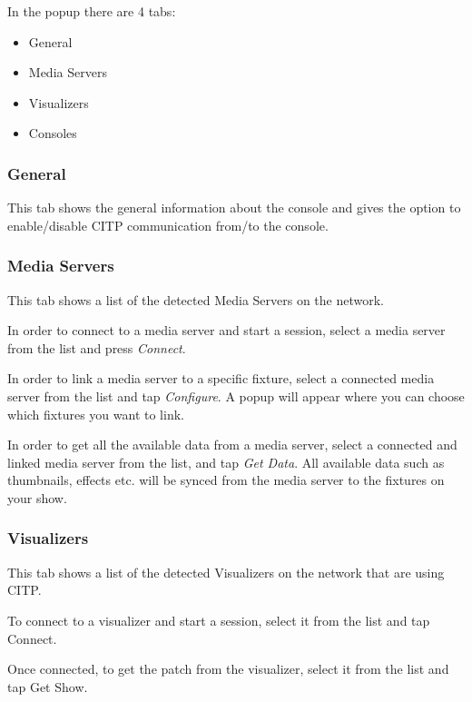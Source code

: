 \documentclass[
]{article}
\begin{document}
In the popup there are 4 tabs:

\begin{itemize}
\item
  General
\item
  Media Servers
\item
  Visualizers
\item
  Consoles
\end{itemize}

\hypertarget{general}{%
\subsubsection{General}\label{general}}

This tab shows the general information about the console and gives the option to enable/disable CITP communication from/to the console.

\hypertarget{media-servers}{%
\subsubsection{Media Servers}\label{media-servers}}

This tab shows a list of the detected Media Servers on the network.

In order to connect to a media server and start a session, select a media server from the list and press \emph{Connect}.

In order to link a media server to a specific fixture, select a connected media server from the list and tap \emph{Configure}. A popup will appear where you can choose which fixtures you want to link.

In order to get all the available data from a media server, select a connected and linked media server from the list, and tap \emph{Get Data}. All available data such as thumbnails, effects etc. will be synced from the media server to the fixtures on your show.

\hypertarget{visualizers}{%
\subsubsection{Visualizers}\label{visualizers}}

This tab shows a list of the detected Visualizers on the network that are using CITP.

To connect to a visualizer and start a session, select it from the list and tap Connect.

Once connected, to get the patch from the visualizer, select it from the list and tap Get Show.
\end{document}

